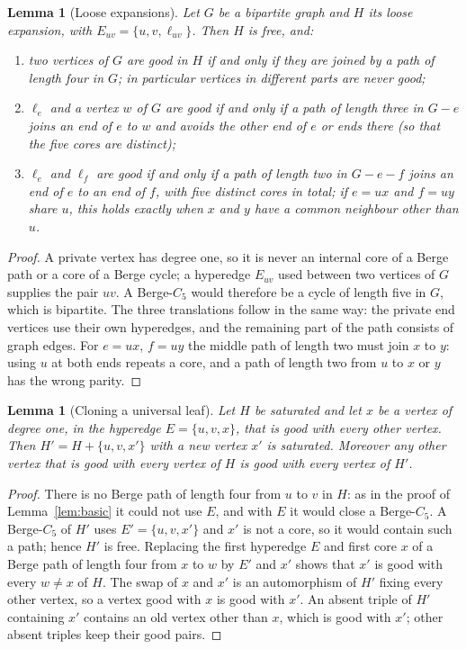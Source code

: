\documentclass[11pt]{article}
\newtheorem{lemma}[theorem]{Lemma}
\theoremstyle{remark}
\begin{document}
\begin{lemma}[Loose expansions]\label{lem:expansion}
Let $G$ be a bipartite graph and $H$ its loose expansion, with
$E_{uv}=\{u,v,\ell_{uv}\}$. Then $H$ is free, and:
\begin{enumerate}
\item two vertices of $G$ are good in $H$ if and only if they are joined by
a path of length four in $G$; in particular vertices in different parts
are never good;
\item $\ell_e$ and a vertex $w$ of $G$ are good if and only if a path of
length three in $G-e$ joins an end of $e$ to $w$ and avoids the other
end of $e$ or ends there (so that the five cores are distinct);
\item $\ell_e$ and $\ell_f$ are good if and only if a path of length two in
$G-e-f$ joins an end of $e$ to an end of $f$, with five distinct cores in
total; if $e=ux$ and $f=uy$ share $u$, this holds exactly when $x$ and $y$
have a common neighbour other than $u$.
\end{enumerate}
\end{lemma}

\begin{proof}
A private vertex has degree one, so it is never an internal core of a
Berge path or a core of a Berge cycle; a hyperedge $E_{uv}$ used between
two vertices of $G$ supplies the pair $uv$. A Berge-$C_5$ would therefore
be a cycle of length five in $G$, which is bipartite. The three
translations follow in the same way: the private end vertices use their
own hyperedges, and the remaining part of the path consists of graph
edges. For $e=ux$, $f=uy$ the middle path of length two must join $x$ to
$y$: using $u$ at both ends repeats a core, and a path of length two from
$u$ to $x$ or $y$ has the wrong parity.
\end{proof}

\begin{lemma}[Cloning a universal leaf]\label{lem:clone}
Let $H$ be saturated and let $x$ be a vertex of degree one, in the
hyperedge $E=\{u,v,x\}$, that is good with every other vertex. Then
$H'=H+\{u,v,x'\}$ with a new vertex $x'$ is saturated. Moreover any other
vertex that is good with every vertex of $H$ is good with every vertex of
$H'$.
\end{lemma}

\begin{proof}
There is no Berge path of length four from $u$ to $v$ in $H$: as in the
proof of Lemma~\ref{lem:basic} it could not use $E$, and with $E$ it would
close a Berge-$C_5$. A Berge-$C_5$ of $H'$ uses $E'=\{u,v,x'\}$ and $x'$
is not a core, so it would contain such a path; hence $H'$ is free.
Replacing the first hyperedge $E$ and first core $x$ of a Berge path of
length four from $x$ to $w$ by $E'$ and $x'$ shows that $x'$ is good with
every $w\neq x$ of $H$. The swap of $x$ and $x'$ is an automorphism of
$H'$ fixing every other vertex, so a vertex good with $x$ is good with
$x'$. An absent triple of $H'$ containing $x'$
contains an old vertex other than $x$, which is good with $x'$; other
absent triples keep their good pairs.
\end{proof}
\end{document}
